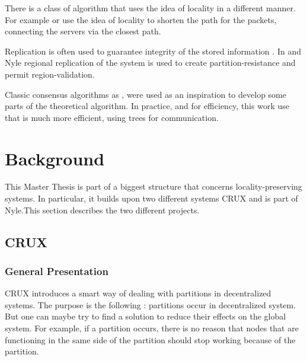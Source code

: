 \documentclass[a4paper,11pt,oneside]{report}
\begin{document}
There is a class of algorithm that uses the idea of locality in a different
manner. For example \cite{Geo-DNS} or \cite{IP Anycast} use the idea of
locality to shorten the path for the packets, connecting the servers via the
closest path.

Replication is often used to guarantee integrity of the stored information
\cite{find-paper-replication}. In \cite{CRUX} and Nyle regional replication of
the system is used to create partition-resistance and permit region-validation.

Classic consensus algorithms as \cite{Paxos}, \cite{PBFT} were used as an
inspiration to develop some parts of the theoretical algorithm. In practice,
and for efficiency, this work use \cite{BlsCoSi} that is much more efficient,
using trees for communication.  

\chapter{Background}


This Master Thesis is part of a biggest structure that concerns
locality-preserving systems. In particular, it builds upon two different
systems CRUX\cite{basescu2014crux} and is part of Nyle.This section describes
the two different projects. 

\section{CRUX}

\subsection{General Presentation} CRUX introduces a smart way of dealing with
partitions in decentralized systems. The purpose is the following : partitions
occur in decentralized system. But one can maybe try to find a solution to
reduce their effects on the global system. For example, if a partition occurs,
there is no reason that nodes that are functioning in the same side of the
partition should stop working because of the partition. 
\end{document}
